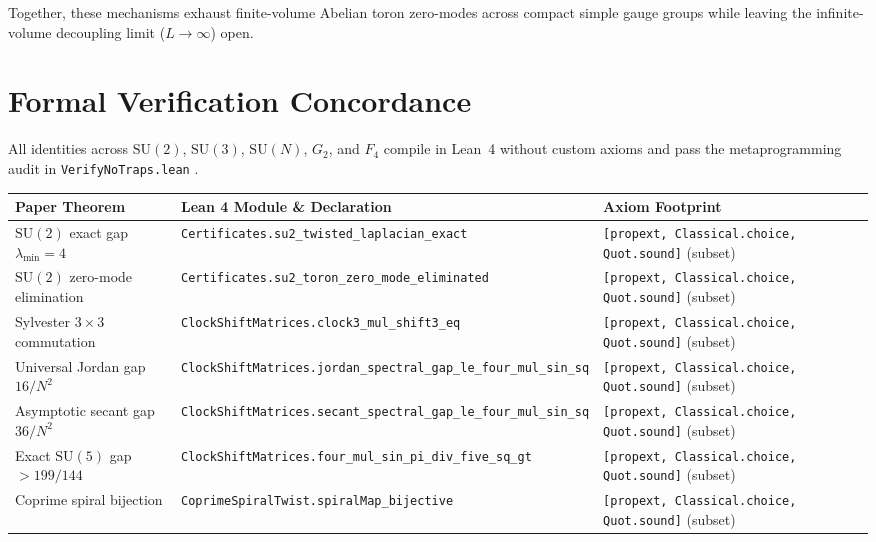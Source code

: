 \documentclass[11pt,a4paper]{article}
\newcommand{\SU}{\mathrm{SU}}
\begin{document}
Together, these mechanisms exhaust finite-volume Abelian toron zero-modes across compact simple gauge groups while leaving the infinite-volume decoupling limit ($L \to \infty$) open.

\section{Formal Verification Concordance}
All identities across $\SU(2)$, $\SU(3)$, $\SU(N)$, $G_2$, and $F_4$ compile in Lean~4 without custom axioms and pass the metaprogramming audit in \texttt{VerifyNoTraps.lean} \cite{Mathlib4}.

\begin{table}[ht]
\centering
\scriptsize
\begin{tabular}{@{}p{4.3cm}p{6.6cm}p{3.4cm}@{}}
\toprule
Paper Theorem & Lean 4 Module \& Declaration & Axiom Footprint \\
\midrule
$\SU(2)$ exact gap $\lambda_{\min} = 4$ & \texttt{Certificates.}\newline\texttt{su2\_twisted\_laplacian\_exact} & \texttt{[propext, Classical.choice,} \texttt{Quot.sound]} (subset) \\
$\SU(2)$ zero-mode elimination & \texttt{Certificates.}\newline\texttt{su2\_toron\_zero\_mode\_eliminated} & \texttt{[propext, Classical.choice,} \texttt{Quot.sound]} (subset) \\
Sylvester $3 \times 3$ commutation & \texttt{ClockShiftMatrices.}\newline\texttt{clock3\_mul\_shift3\_eq} & \texttt{[propext, Classical.choice,} \texttt{Quot.sound]} (subset) \\
Universal Jordan gap $16/N^2$ & \texttt{ClockShiftMatrices.}\newline\texttt{jordan\_spectral\_gap\_le\_four\_mul\_sin\_sq} & \texttt{[propext, Classical.choice,} \texttt{Quot.sound]} (subset) \\
Asymptotic secant gap $36/N^2$ & \texttt{ClockShiftMatrices.}\newline\texttt{secant\_spectral\_gap\_le\_four\_mul\_sin\_sq} & \texttt{[propext, Classical.choice,} \texttt{Quot.sound]} (subset) \\
Exact $\SU(5)$ gap $> 199/144$ & \texttt{ClockShiftMatrices.}\newline\texttt{four\_mul\_sin\_pi\_div\_five\_sq\_gt} & \texttt{[propext, Classical.choice,} \texttt{Quot.sound]} (subset) \\
Coprime spiral bijection & \texttt{CoprimeSpiralTwist.}\newline\texttt{spiralMap\_bijective} & \texttt{[propext, Classical.choice,} \texttt{Quot.sound]} (subset) \\

\end{tabular}
\end{table}
\end{document}
